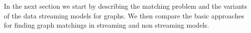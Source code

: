 \documentclass{scrartcl}
\begin{document}
In the next section we start by describing the matching problem and the variants of the data streaming models for graphs. We then compare the basic approaches for finding graph matchings in streaming and non streaming models.



\end{document}
